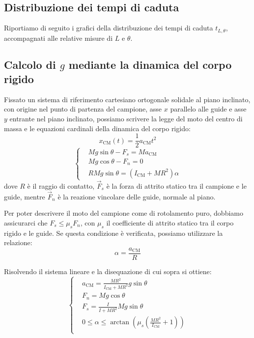 \documentclass{article}
\begin{document}
\subsection{Distribuzione dei tempi di caduta}

Riportiamo di seguito i grafici della distribuzione dei tempi di caduta $t_{L,\theta}$,
accompagnati alle relative misure di $L$ e $\theta$.

\begin{center}
\end{center}

\subsection{Calcolo di $g$ mediante la dinamica del corpo rigido}

Fissato un sistema di riferimento cartesiano ortogonale solidale
al piano inclinato, con origine nel punto di partenza del campione,
asse $x$ parallelo alle guide e asse $y$ entrante nel piano inclinato,
possiamo scrivere la legge del moto del centro di massa e le
equazioni cardinali della dinamica del corpo rigido:
\[x_\text{CM}(t) = \frac{1}{2} a_\text{CM} t^2\]
\[\left\{\begin{aligned}
    &M g \sin\theta - F_s = M a_\text{CM} \\
    &M g \cos\theta - F_n = 0 \\
    &R M g \sin\theta = \left(I_\text{CM} + M R^2\right) \alpha
\end{aligned}\right.\]
dove $R$ è il raggio di contatto, $\vec{F}_s$ è la forza di attrito statico
tra il campione e le guide, mentre $\vec{F}_n$ è la reazione vincolare delle
guide, normale al piano.

Per poter descrivere il moto del campione come di rotolamento puro,
dobbiamo assicurarci che $F_s \le \mu_s F_n$, con $\mu_s$ il
coefficiente di attrito statico tra il corpo rigido e le guide.
Se questa condizione è verificata, possiamo utilizzare la relazione:
\[\alpha = \frac{a_\text{CM}}{R}\]

Risolvendo il sistema lineare e la disequazione di cui sopra si ottiene:
\[\left\{\begin{aligned}
    &a_\text{CM} = \frac{M R^2}{I_\text{CM} + M R^2} g\sin\theta \\
    &F_n = M g \cos\theta \\
    &F_s = \frac{I}{I + M R^2} M g \sin\theta \\
    & 0 \le \alpha \le \arctan\left(\mu_s \left(\frac{MR^2}{I_\text{CM}} + 1\right)\right) \\
\end{aligned}\right.\]
\end{document}
